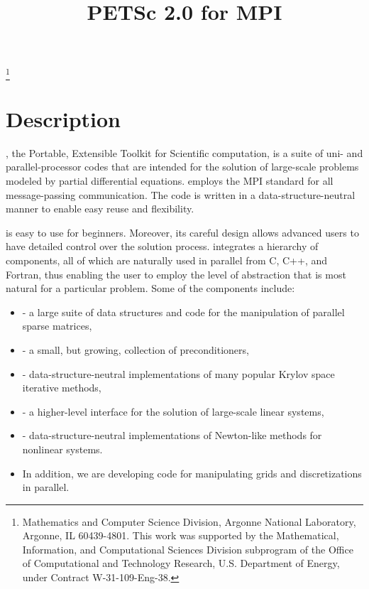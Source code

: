 \pagestyle{empty}

\pagestyle{empty}
\title{PETSc 2.0 for MPI}
\thanks{Mathematics and Computer Science Division,
Argonne National Laboratory,
Argonne, IL 60439-4801.
This work was supported by the Mathematical,
        Information, and Computational Sciences Division subprogram of
        the Office of Computational and Technology Research,
        U.S. Department of Energy, under Contract W-31-109-Eng-38.}

\date{}
\maketitle

\newcommand{\vsp}{\vspace{-1.5mm}}

\section*{Description}

, the Portable, Extensible Toolkit for Scientific computation,
is a suite of uni- and parallel-processor codes that are intended for
the solution of large-scale problems modeled by partial differential
equations.   employs the MPI standard for all
message-passing communication.  The code is written in a
data-structure-neutral manner to enable easy reuse and flexibility.

 is easy to use for beginners.  Moreover, its careful
design allows advanced users to have detailed control over the solution
process.  integrates a hierarchy of components, all of
which are naturally used in parallel from C, C++, and Fortran, thus
enabling the user to employ the level of abstraction that is most
natural for a particular problem.  Some of the components include:

\vspace{-.4cm}
\begin{itemize}
\item {} - a large suite of data structures and code
      for the manipulation of parallel sparse matrices,
\vsp
\item {} - a small, but growing, collection of preconditioners,
\vsp
\item {} - data-structure-neutral implementations of
      many popular Krylov space iterative methods,
\vsp
\item {} - a higher-level interface for the solution of
      large-scale linear systems,

\vsp
\item {} - data-structure-neutral implementations of Newton-like
      methods for nonlinear systems.
\vsp
\item In addition, we are developing code for manipulating grids
      and discretizations in parallel.
\end{itemize}
\vspace{-.3cm}

